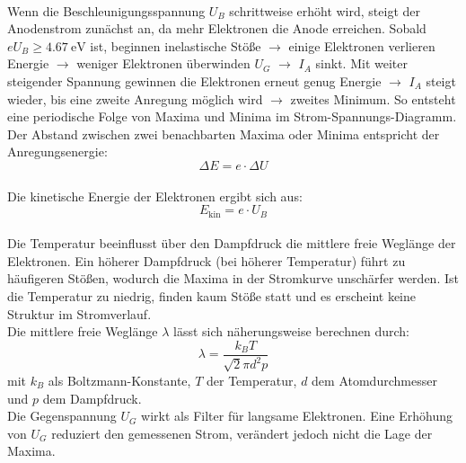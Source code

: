 \vspace{0.3cm}\\
Wenn die Beschleunigungsspannung $U_B$ schrittweise erhöht wird, steigt der Anodenstrom zunächst an, da mehr Elektronen die Anode erreichen. Sobald $e U_B \geq \SI{4.67}{\electronvolt}$ ist, beginnen inelastische Stöße $\rightarrow$ einige Elektronen verlieren Energie $\rightarrow$ weniger Elektronen überwinden $U_G$ $\rightarrow$ $I_A$ sinkt. Mit weiter steigender Spannung gewinnen die Elektronen erneut genug Energie $\rightarrow$ $I_A$ steigt wieder, bis eine zweite Anregung möglich wird $\rightarrow$ zweites Minimum. So entsteht eine periodische Folge von Maxima und Minima im Strom-Spannungs-Diagramm.
\vspace{0.3cm}\\
Der Abstand zwischen zwei benachbarten Maxima oder Minima entspricht der Anregungsenergie:
\begin{equation}
\Delta E = e \cdot \Delta U
\end{equation}
\vspace{0.3cm}\\
Die kinetische Energie der Elektronen ergibt sich aus:
\begin{equation}
E_{\text{kin}} = e \cdot U_B
\end{equation}
\vspace{0.3cm}\\
Die Temperatur beeinflusst über den Dampfdruck die mittlere freie Weglänge der Elektronen. Ein höherer Dampfdruck (bei höherer Temperatur) führt zu häufigeren Stößen, wodurch die Maxima in der Stromkurve unschärfer werden. Ist die Temperatur zu niedrig, finden kaum Stöße statt und es erscheint keine Struktur im Stromverlauf.
\vspace{0.3cm}\\
Die mittlere freie Weglänge $\lambda$ lässt sich näherungsweise berechnen durch:
\begin{equation}
\lambda = \frac{k_B T}{\sqrt{2} \pi d^2 p}
\end{equation}
mit $k_B$ als Boltzmann-Konstante, $T$ der Temperatur, $d$ dem Atomdurchmesser und $p$ dem Dampfdruck.
\vspace{0.3cm}\\
Die Gegenspannung $U_G$ wirkt als Filter für langsame Elektronen. Eine Erhöhung von $U_G$ reduziert den gemessenen Strom, verändert jedoch nicht die Lage der Maxima.
\vspace{0.3cm}\\
